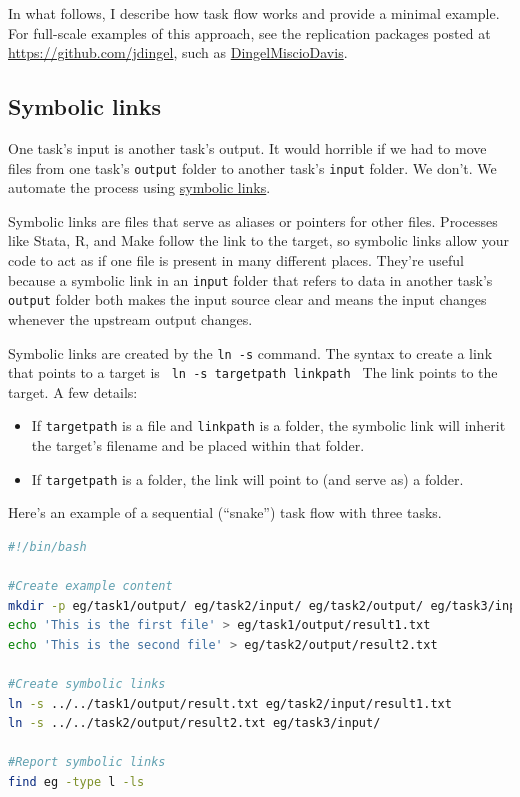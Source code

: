 In what follows, I describe how task flow works and provide a minimal example.
For full-scale examples of this approach, see the replication packages posted at \url{https://github.com/jdingel},
such as \href{https://github.com/jdingel/DingelMiscioDavis}{DingelMiscioDavis}.

\subsection{Symbolic links}

One task's input is another task's output.
It would horrible if we had to move files from one task's \texttt{output} folder to another task's \texttt{input} folder.
We don't.
We automate the process using \href{https://en.wikipedia.org/wiki/Symbolic_link\#POSIX_and_Unix-like_operating_systems}{symbolic links}.

Symbolic links are files that serve as aliases or pointers for other files.
Processes like Stata, R, and Make follow the link to the target,
so symbolic links allow your code to act as if one file is present in many different places.
They're useful because a symbolic link in an \texttt{input} folder that refers to data in another task's \texttt{output} folder
both makes the input source clear and means the input changes whenever the upstream output changes.

Symbolic links are created by the \texttt{ln -s} command.
The syntax to create a link that points to a target is
\texttt{
ln -s targetpath linkpath
}
The link points to the target. A few details:
\begin{itemize}
	\item If \texttt{targetpath} is a file and \texttt{linkpath} is a folder, the symbolic link will inherit the target's filename and be placed within that folder.
	\item If \texttt{targetpath} is a folder, the link will point to (and serve as) a folder.
\end{itemize}

Here's an example of a sequential (``snake'') task flow with three tasks.
\begin{lstlisting}[language=bash]
#!/bin/bash

#Create example content
mkdir -p eg/task1/output/ eg/task2/input/ eg/task2/output/ eg/task3/input/
echo 'This is the first file' > eg/task1/output/result1.txt
echo 'This is the second file' > eg/task2/output/result2.txt

#Create symbolic links
ln -s ../../task1/output/result.txt eg/task2/input/result1.txt
ln -s ../../task2/output/result2.txt eg/task3/input/

#Report symbolic links
find eg -type l -ls
\end{lstlisting}

